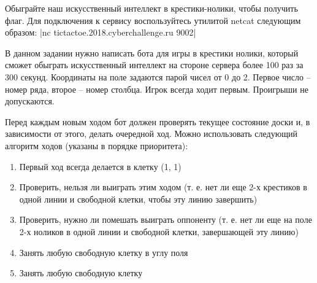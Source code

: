 
Обыграйте наш искусственный интеллект в крестики-нолики, чтобы получить флаг. Для подключения к сервису воспользуйтесь утилитой netcat следующим образом:
|nc tictactoe.2018.cyberchallenge.ru 9002|

\solutionSection

В данном задании нужно написать бота для игры в крестики нолики, который сможет обыграть искусственный интеллект на стороне сервера более 100 раз за 300 секунд. Координаты на поле задаются парой чисел от 0 до 2. Первое число – номер ряда, второе – номер столбца. Игрок всегда ходит первым. Проигрыши не допускаются.

Перед каждым новым ходом бот должен проверять текущее состояние доски и, в зависимости от этого, делать очередной ход. Можно использовать следующий алгоритм ходов (указаны в порядке приоритета):
\begin{enumerate}
    \item Первый ход всегда делается в клетку (1, 1)
    \item Проверить, нельзя ли выиграть этим ходом (т. е. нет ли еще 2-х крестиков в одной линии и свободной клетки, чтобы эту линию завершить)
    \item Проверить, нужно ли помешать выиграть оппоненту (т. е. нет ли еще на поле 2-х ноликов в одной линии и свободной клетки, завершающей эту линию)
    \item Занять любую свободную клетку в углу поля
    \item Занять любую свободную клетку
\end{enumerate}


